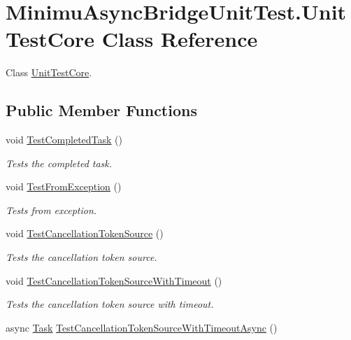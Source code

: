 \hypertarget{class_minimu_async_bridge_unit_test_1_1_unit_test_core}{}\section{Minimu\+Async\+Bridge\+Unit\+Test.\+Unit\+Test\+Core Class Reference}
\label{class_minimu_async_bridge_unit_test_1_1_unit_test_core}


Class \hyperlink{class_minimu_async_bridge_unit_test_1_1_unit_test_core}{Unit\+Test\+Core}.  


\subsection*{Public Member Functions}
\begin{DoxyCompactItemize}
\item 
void \hyperlink{class_minimu_async_bridge_unit_test_1_1_unit_test_core_af93a5a76c0c3dee841fed71921802542}{Test\+Completed\+Task} ()
\begin{DoxyCompactList}\small\item\em Tests the completed task. \end{DoxyCompactList}\item 
void \hyperlink{class_minimu_async_bridge_unit_test_1_1_unit_test_core_a239f3574cb7588879aca72d8544f8019}{Test\+From\+Exception} ()
\begin{DoxyCompactList}\small\item\em Tests from exception. \end{DoxyCompactList}\item 
void \hyperlink{class_minimu_async_bridge_unit_test_1_1_unit_test_core_a350471a3a6646906121c7fffde204e09}{Test\+Cancellation\+Token\+Source} ()
\begin{DoxyCompactList}\small\item\em Tests the cancellation token source. \end{DoxyCompactList}\item 
void \hyperlink{class_minimu_async_bridge_unit_test_1_1_unit_test_core_a235a1fa932dc49bb4576afa898b20950}{Test\+Cancellation\+Token\+Source\+With\+Timeout} ()
\begin{DoxyCompactList}\small\item\em Tests the cancellation token source with timeout. \end{DoxyCompactList}\item 
async \hyperlink{class_system_1_1_threading_1_1_tasks_1_1_task}{Task} \hyperlink{class_minimu_async_bridge_unit_test_1_1_unit_test_core_ac62554c081770a6814d5506c25c8f6f4}{Test\+Cancellation\+Token\+Source\+With\+Timeout\+Async} ()

\end{DoxyCompactItemize}
